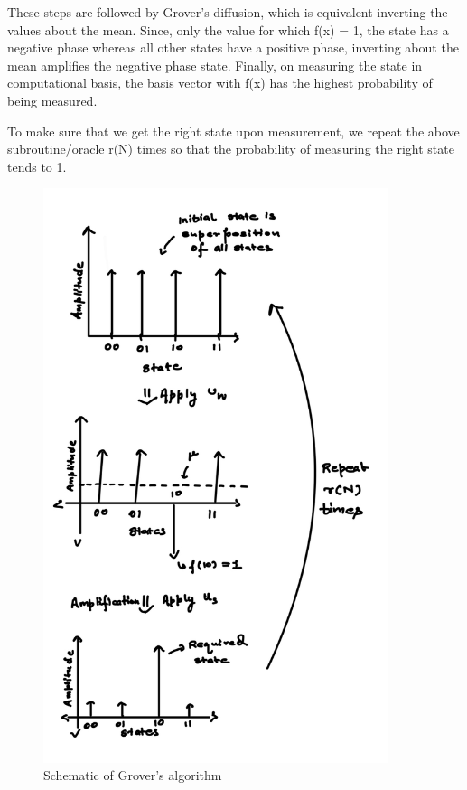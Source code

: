 \documentclass{article}
\begin{document}
These steps are followed by Grover's diffusion, which is equivalent inverting the values about the mean. Since, only the value for which f(x) = 1, the state has a negative phase whereas all other states have a positive phase, inverting about the mean amplifies the negative phase state. Finally, on measuring the state in computational basis, the basis vector with f(x) has the highest probability of being measured.

To make sure that we get the right state upon measurement, we repeat the above subroutine/oracle r(N) times so that the probability of measuring the right state tends to 1.

\begin{figure}[H]
  \centering
\includegraphics[width=0.9\textwidth]{pro.jpeg}
  \caption{Schematic of Grover's algorithm}
  \label{Schematic of Grover's algorithm}
\end{figure}
\end{document}
